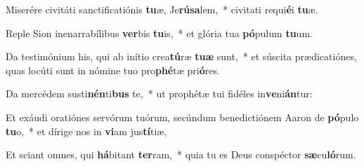 \item Miserére civitáti sanctificatiónis \textbf{tu}æ, Je\textbf{rú}\textbf{sa}lem,~* civitati requi\textbf{é}i \textbf{tu}æ.
\item Reple Sion inenarrabílibus \textbf{ver}bis \textbf{tu}is,~* et glória tua \textbf{pó}pulum \textbf{tu}um.
\item Da testimónium his, qui ab inítio crea\textbf{tú}ræ \textbf{tu}\textbf{æ} sunt,~* et súscita prædicatiónes, quas locúti sunt in nómine tuo pro\textbf{phé}tæ pri\textbf{ó}res.
\item Da mercédem susti\textbf{nén}ti\textbf{bus} te,~* ut prophétæ tui fidéles in\textbf{ve}ni\textbf{án}tur:
\item Et exáudi oratiónes servórum tuórum, secúndum benedictiónem Aaron de \textbf{pó}pulo \textbf{tu}o,~* et dírige nos in \textbf{vi}am jus\textbf{tí}tiæ,
\item Et sciant omnes, qui \textbf{há}bitant \textbf{ter}ram,~* quia tu es Deus conspéctor \textbf{sæ}cu\textbf{ló}rum.
